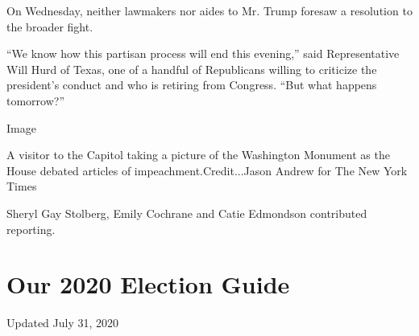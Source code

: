 On Wednesday, neither lawmakers nor aides to Mr. Trump foresaw a
resolution to the broader fight.

``We know how this partisan process will end this evening,'' said
Representative Will Hurd of Texas, one of a handful of Republicans
willing to criticize the president's conduct and who is retiring from
Congress. ``But what happens tomorrow?''

Image

A visitor to the Capitol taking a picture of the Washington Monument as
the House debated articles of impeachment.Credit...Jason Andrew for The
New York Times

Sheryl Gay Stolberg, Emily Cochrane and Catie Edmondson contributed
reporting.

\hypertarget{our-2020-election-guide}{%
\section{Our 2020 Election Guide}\label{our-2020-election-guide}}

Updated July 31, 2020

